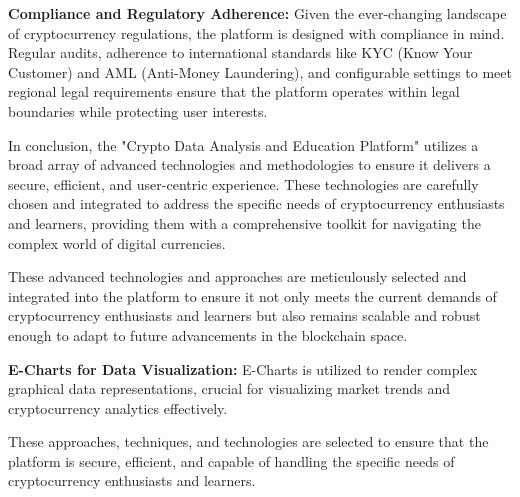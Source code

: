 \documentclass[12pt]{report}
\begin{document}
\textbf{Compliance and Regulatory Adherence:} Given the ever-changing landscape of cryptocurrency regulations, the platform is designed with compliance in mind. Regular audits, adherence to international standards like KYC (Know Your Customer) and AML (Anti-Money Laundering), and configurable settings to meet regional legal requirements ensure that the platform operates within legal boundaries while protecting user interests.

In conclusion, the "Crypto Data Analysis and Education Platform" utilizes a broad array of advanced technologies and methodologies to ensure it delivers a secure, efficient, and user-centric experience. These technologies are carefully chosen and integrated to address the specific needs of cryptocurrency enthusiasts and learners, providing them with a comprehensive toolkit for navigating the complex world of digital currencies.

These advanced technologies and approaches are meticulously selected and integrated into the platform to ensure it not only meets the current demands of cryptocurrency enthusiasts and learners but also remains scalable and robust enough to adapt to future advancements in the blockchain space.


\textbf{E-Charts for Data Visualization:} E-Charts is utilized to render complex graphical data representations, crucial for visualizing market trends and cryptocurrency analytics effectively.

These approaches, techniques, and technologies are selected to ensure that the platform is secure, efficient, and capable of handling the specific needs of cryptocurrency enthusiasts and learners.
\end{document}
